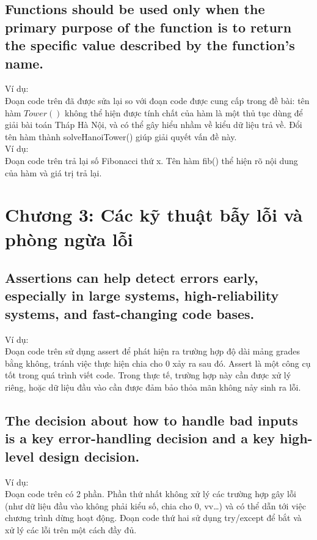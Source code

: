 \documentclass{article}
\begin{document}
    \subsection{Functions should be used only when the primary purpose of the function is to return the specific value described by the function's name.}
        Ví dụ: \\
    Đoạn code trên đã được sửa lại so với đoạn code được cung cấp trong đề bài: tên hàm $Tower()$ không thể hiện được tính chất của hàm là một thủ tục dùng để giải bài toán Tháp Hà Nội, và có thể gây hiểu nhầm về kiểu dữ liệu trả về. Đổi tên hàm thành solveHanoiTower() giúp giải quyết vấn đề này.\\
    
    Ví dụ: \\
    Đoạn code trên trả lại số Fibonacci thứ x. Tên hàm fib() thể hiện rõ nội dung của hàm và giá trị trả lại.
    
\section{Chương 3: Các kỹ thuật bẫy lỗi và phòng ngừa lỗi}
    \subsection{Assertions can help detect errors early, especially in large systems, high-reliability systems, and fast-changing code bases.}
    Ví dụ: \\
    Đoạn code trên sử dụng assert để phát hiện ra trường hợp độ dài mảng grades bằng không, tránh việc thực hiện chia cho 0 xảy ra sau đó. Assert là một công cụ tốt trong quá trình viết code. Trong thực tế, trường hợp này cần được xử lý riêng, hoặc dữ liệu đầu vào cần được đảm bảo thỏa mãn không nảy sinh ra lỗi.\\
    
    \subsection{ The decision about how to handle bad inputs is a key error-handling decision and a key high-level design decision.}
    Ví dụ: \\
    Đoạn code trên có 2 phần. Phần thứ nhất không xử lý các trường hợp gây lỗi (như dữ liệu đầu vào không phải kiểu số, chia cho 0, vv…) và có thể dẫn tới việc chương trình dừng hoạt động. Đoạn code thứ hai sử dụng try/except để bắt và xử lý các lỗi trên một cách đầy đủ. 
    
\end{document}
